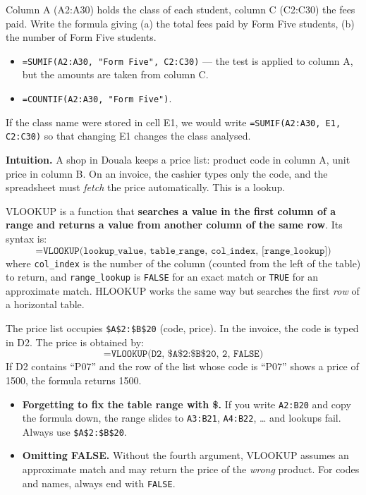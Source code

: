 \documentclass[11pt]{article}
\newcommand{\cle}[1]{{\popxbold\color{popdark}#1}}
\newcounter{popsec}
\newcounter{popsub}
\newcommand{\courssub}[1]{%
  \stepcounter{popsub}%
  \par\vspace{9pt}\noindent{\popxbold\fontsize{11.5}{13}\selectfont\color{popink}{\color{poporange}\thepopsec.\thepopsub}\hspace{6pt}#1}\par\nopagebreak\vspace{4pt}
}
\begin{document}
\begin{exoresolu}
Column A (A2:A30) holds the class of each student, column C (C2:C30) the fees paid. Write the formula giving (a) the total fees paid by Form Five students, (b) the number of Form Five students.
\tcblower
\begin{itemize}
\item[(a)] \texttt{=SUMIF(A2:A30, "Form Five", C2:C30)} — the test is applied to column A, but the amounts are taken from column C.
\item[(b)] \texttt{=COUNTIF(A2:A30, "Form Five")}.
\end{itemize}
If the class name were stored in cell E1, we would write \texttt{=SUMIF(A2:A30, E1, C2:C30)} so that changing E1 changes the class analysed.
\end{exoresolu}

\courssub{Lookup Functions: VLOOKUP and HLOOKUP}

\textbf{Intuition.} A shop in Douala keeps a price list: product code in column A, unit price in column B. On an invoice, the cashier types only the code, and the spreadsheet must \emph{fetch} the price automatically. This is a lookup.

\begin{definition}[VLOOKUP]
\cle{VLOOKUP} is a function that \textbf{searches a value in the first column of a range and returns a value from another column of the same row}. Its syntax is:
\[ \texttt{=VLOOKUP(lookup\_value, table\_range, col\_index, [range\_lookup])} \]
where \texttt{col\_index} is the number of the column (counted from the left of the table) to return, and \texttt{range\_lookup} is \texttt{FALSE} for an exact match or \texttt{TRUE} for an approximate match. \cle{HLOOKUP} works the same way but searches the first \emph{row} of a horizontal table.
\end{definition}

\begin{exemplebox}
The price list occupies \texttt{\$A\$2:\$B\$20} (code, price). In the invoice, the code is typed in D2. The price is obtained by:
\[ \texttt{=VLOOKUP(D2, \$A\$2:\$B\$20, 2, FALSE)} \]
If D2 contains ``P07'' and the row of the list whose code is ``P07'' shows a price of 1500, the formula returns 1500.
\end{exemplebox}

\begin{attention}
\begin{itemize}
\item \textbf{Forgetting to fix the table range with \$.} If you write \texttt{A2:B20} and copy the formula down, the range slides to \texttt{A3:B21}, \texttt{A4:B22}, \dots{} and lookups fail. Always use \texttt{\$A\$2:\$B\$20}.
\item \textbf{Omitting FALSE.} Without the fourth argument, VLOOKUP assumes an approximate match and may return the price of the \emph{wrong} product. For codes and names, always end with \texttt{FALSE}.
\end{itemize}
\end{attention}
\end{document}
